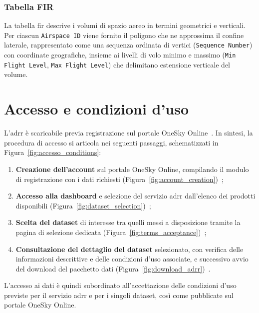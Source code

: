 \subsubsection{Tabella FIR}
\label{sec:table_fir}
La tabella \gls{fir} descrive i volumi di spazio aereo in termini geometrici e verticali.  
Per ciascun \texttt{Airspace ID} viene fornito il poligono che ne approssima il confine laterale, rappresentato come una sequenza ordinata di vertici (\texttt{Sequence Number}) con coordinate geografiche, insieme ai livelli di volo minimo e massimo (\texttt{Min Flight Level}, \texttt{Max Flight Level}) che delimitano estensione verticale del volume.  

\section{Accesso e condizioni d’uso}
L’\gls{adrr} è scaricabile previa registrazione sul portale OneSky Online~\cite{eurocontrol2025onesky}.  
In sintesi, la procedura di accesso si articola nei seguenti passaggi, schematizzati in Figura~\ref{fig:accesso_conditions}:
\begin{enumerate}
  \item \textbf{Creazione dell’account} sul portale OneSky Online, compilando il modulo di registrazione con i dati richiesti (Figura~\ref{fig:account_creation})~\cite{OneSky-account};
  \item \textbf{Accesso alla dashboard} e selezione del servizio \gls{adrr} dall’elenco dei prodotti disponibili (Figura~\ref{fig:dataset_selection})~\cite{OneSky-adr};
  \item \textbf{Scelta del dataset} di interesse tra quelli messi a disposizione tramite la pagina di selezione dedicata (Figura~\ref{fig:terms_acceptance})~\cite{OneSky-adr-dataset};
  \item \textbf{Consultazione del dettaglio del dataset} selezionato, con verifica delle informazioni descrittive e delle condizioni d’uso associate, e successivo avvio del download del pacchetto dati (Figura~\ref{fig:download_adrr})~\cite{OneSky-adr-dataset2}.
\end{enumerate}
L’accesso ai dati è quindi subordinato all’accettazione delle condizioni d’uso previste per il servizio \gls{adrr} e per i singoli dataset, così come pubblicate sul portale OneSky Online.
\clearpage
